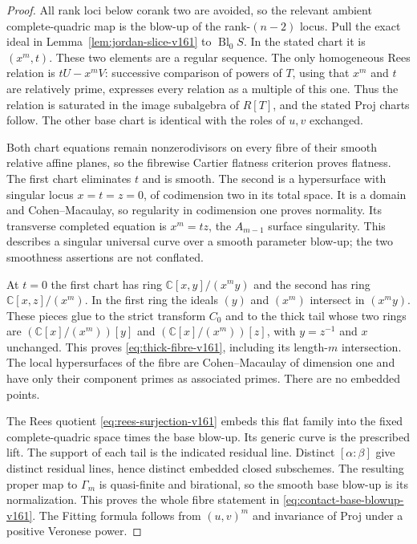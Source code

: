 \documentclass[11pt,reqno]{amsart}
\numberwithin{equation}{section}
\theoremstyle{definition}\newtheorem{definition}[theorem]{Definition}
\theoremstyle{remark}\newtheorem{remark}[theorem]{Remark}
\newcommand{\C}{\mathbb C}\newcommand{\Q}{\mathbb Q}
\begin{document}
\begin{proof}
All rank loci below corank two are avoided, so the relevant ambient
complete-quadric map is the blow-up of the rank-$(n-2)$ locus.
Pull the exact ideal in Lemma~\ref{lem:jordan-slice-v161} to
$\operatorname{Bl}_0 S$. In the stated chart it is $(x^m,t)$.
These two elements are a regular sequence. The only homogeneous Rees
relation is $tU-x^m V$: successive comparison of powers of $T$,
using that $x^m$ and $t$ are relatively prime, expresses every relation
as a multiple of this one. Thus the relation is saturated in the image
subalgebra of $R[T]$, and the stated Proj charts follow. The other base
chart is identical with the roles of $u,v$ exchanged.

Both chart equations remain nonzerodivisors on every fibre of their
smooth relative affine planes, so the fibrewise Cartier flatness
criterion proves flatness. The first chart eliminates $t$ and is
smooth. The second is a hypersurface with singular locus
$x=t=z=0$, of codimension two in its total space. It is a domain and
Cohen--Macaulay, so regularity in codimension one proves normality.
Its transverse completed equation is $x^m=tz$, the $A_{m-1}$ surface
singularity. This describes a singular universal curve over a smooth
parameter blow-up; the two smoothness assertions are not conflated.

At $t=0$ the first chart has ring $\C[x,y]/(x^m y)$ and the second
has ring $\C[x,z]/(x^m)$. In the first ring the ideals $(y)$ and
$(x^m)$ intersect in $(x^m y)$. These pieces glue to the strict
transform $C_0$ and to the thick tail whose two rings are
$(\C[x]/(x^m))[y]$ and $(\C[x]/(x^m))[z]$, with $y=z^{-1}$ and
$x$ unchanged. This proves \eqref{eq:thick-fibre-v161}, including its
length-$m$ intersection. The local hypersurfaces of the fibre are
Cohen--Macaulay of dimension one and have only their component primes
as associated primes. There are no embedded points.

The Rees quotient \eqref{eq:rees-surjection-v161} embeds this flat
family into the fixed complete-quadric space times the base blow-up.
Its generic curve is the prescribed lift. The support of each tail
is the indicated residual line. Distinct $[\alpha:\beta]$ give
distinct residual lines, hence distinct embedded closed subschemes.
The resulting proper map to $\Gamma_m$ is quasi-finite and birational,
so the smooth base blow-up is its normalization. This proves the
whole fibre statement in \eqref{eq:contact-base-blowup-v161}. The
Fitting formula follows from $(u,v)^m$ and invariance of Proj under
a positive Veronese power.


\end{proof}
\end{document}
